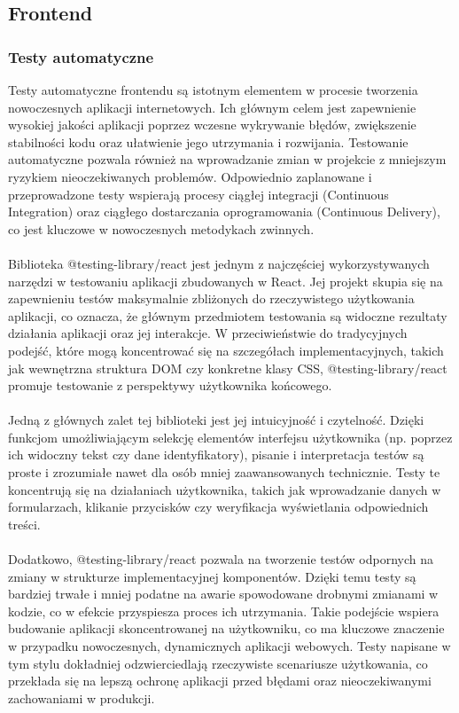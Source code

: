 \documentclass[12pt,a4paper]{article}
\begin{document}
\subsection{Frontend}

\subsubsection{Testy automatyczne}

\noindent
Testy automatyczne frontendu są istotnym elementem w procesie tworzenia nowoczesnych aplikacji internetowych. Ich głównym celem jest zapewnienie wysokiej jakości aplikacji poprzez wczesne wykrywanie błędów, zwiększenie stabilności kodu oraz ułatwienie jego utrzymania i rozwijania. Testowanie automatyczne pozwala również na wprowadzanie zmian w projekcie z mniejszym ryzykiem nieoczekiwanych problemów. Odpowiednio zaplanowane i przeprowadzone testy wspierają procesy ciągłej integracji (Continuous Integration) oraz ciągłego dostarczania oprogramowania (Continuous Delivery), co jest kluczowe w nowoczesnych metodykach zwinnych.
\\\\
Biblioteka @testing-library/react jest jednym z najczęściej wykorzystywanych narzędzi w testowaniu aplikacji zbudowanych w React. Jej projekt skupia się na zapewnieniu testów maksymalnie zbliżonych do rzeczywistego użytkowania aplikacji, co oznacza, że głównym przedmiotem testowania są widoczne rezultaty działania aplikacji oraz jej interakcje. W przeciwieństwie do tradycyjnych podejść, które mogą koncentrować się na szczegółach implementacyjnych, takich jak wewnętrzna struktura DOM czy konkretne klasy CSS, @testing-library/react promuje testowanie z perspektywy użytkownika końcowego.
\\\\
Jedną z głównych zalet tej biblioteki jest jej intuicyjność i czytelność. Dzięki funkcjom umożliwiającym selekcję elementów interfejsu użytkownika (np. poprzez ich widoczny tekst czy dane identyfikatory), pisanie i interpretacja testów są proste i zrozumiałe nawet dla osób mniej zaawansowanych technicznie. Testy te koncentrują się na działaniach użytkownika, takich jak wprowadzanie danych w formularzach, klikanie przycisków czy weryfikacja wyświetlania odpowiednich treści.
\\\\
Dodatkowo, @testing-library/react pozwala na tworzenie testów odpornych na zmiany w strukturze implementacyjnej komponentów. Dzięki temu testy są bardziej trwałe i mniej podatne na awarie spowodowane drobnymi zmianami w kodzie, co w efekcie przyspiesza proces ich utrzymania. Takie podejście wspiera budowanie aplikacji skoncentrowanej na użytkowniku, co ma kluczowe znaczenie w przypadku nowoczesnych, dynamicznych aplikacji webowych. Testy napisane w tym stylu dokładniej odzwierciedlają rzeczywiste scenariusze użytkowania, co przekłada się na lepszą ochronę aplikacji przed błędami oraz nieoczekiwanymi zachowaniami w produkcji.
\end{document}
